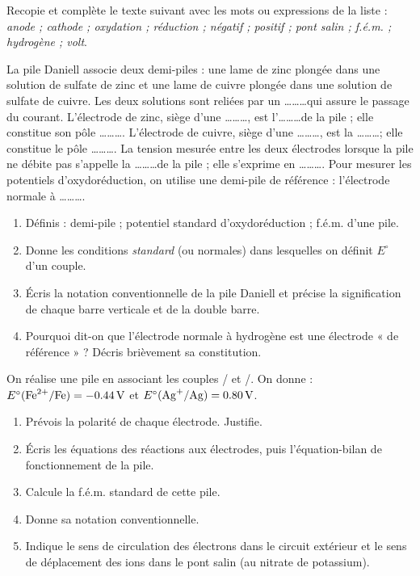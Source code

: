\documentclass[11pt]{article}
\newcounter{popsec}
\newcounter{popsub}
\newcommand{\courssub}[1]{%
  \stepcounter{popsub}%
  \par\vspace{9pt}\noindent{\popxbold\fontsize{11.5}{13}\selectfont\color{popink}{\color{poporange}\thepopsec.\thepopsub}\hspace{6pt}#1}\par\nopagebreak\vspace{4pt}
}
\begin{document}
\begin{exercice}
Recopie et complète le texte suivant avec les mots ou expressions de la liste : \emph{anode ; cathode ; oxydation ; réduction ; négatif ; positif ; pont salin ; f.é.m. ; hydrogène ; volt}.

La pile Daniell associe deux demi-piles : une lame de zinc plongée dans une solution de sulfate de zinc et une lame de cuivre plongée dans une solution de sulfate de cuivre. Les deux solutions sont reliées par un \ldots\ldots\ldots qui assure le passage du courant. L'électrode de zinc, siège d'une \ldots\ldots\ldots, est l'\ldots\ldots\ldots de la pile ; elle constitue son pôle \ldots\ldots\ldots. L'électrode de cuivre, siège d'une \ldots\ldots\ldots, est la \ldots\ldots\ldots ; elle constitue le pôle \ldots\ldots\ldots. La tension mesurée entre les deux électrodes lorsque la pile ne débite pas s'appelle la \ldots\ldots\ldots de la pile ; elle s'exprime en \ldots\ldots\ldots. Pour mesurer les potentiels d'oxydoréduction, on utilise une demi-pile de référence : l'électrode normale à \ldots\ldots\ldots.
\end{exercice}

\begin{exercice}
\begin{enumerate}
\item Définis : demi-pile ; potentiel standard d'oxydoréduction ; f.é.m. d'une pile.
\item Donne les conditions \emph{standard} (ou normales) dans lesquelles on définit $E^{\circ}$ d'un couple.
\item Écris la notation conventionnelle de la pile Daniell et précise la signification de chaque barre verticale et de la double barre.
\item Pourquoi dit-on que l'électrode normale à hydrogène est une électrode « de référence » ? Décris brièvement sa constitution.
\end{enumerate}
\end{exercice}

\courssub{Je m'entraîne}

\begin{exercice}
On réalise une pile en associant les couples / et /. On donne : $E^{\circ}(\ce{Fe^2+}/\ce{Fe}) = \SI{-0,44}{V}$ et $E^{\circ}(\ce{Ag+}/\ce{Ag}) = \SI{+0,80}{V}$.
\begin{enumerate}
\item Prévois la polarité de chaque électrode. Justifie.
\item Écris les équations des réactions aux électrodes, puis l'équation-bilan de fonctionnement de la pile.
\item Calcule la f.é.m. standard de cette pile.
\item Donne sa notation conventionnelle.
\item Indique le sens de circulation des électrons dans le circuit extérieur et le sens de déplacement des ions dans le pont salin (au nitrate de potassium).
\end{enumerate}
\end{exercice}
\end{document}
